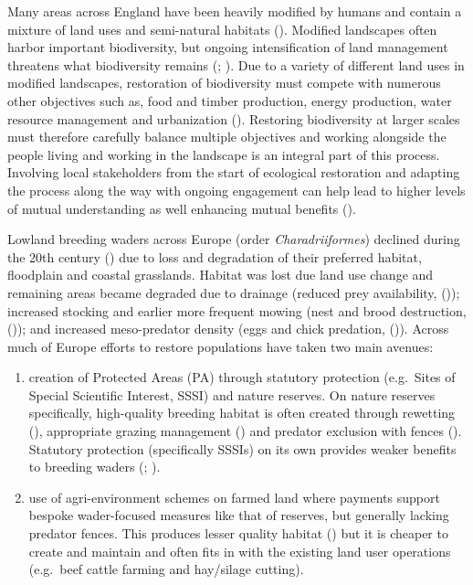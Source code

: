 \documentclass[
  12pt,
  letterpaper,
  DIV=11,
  numbers=noendperiod]{scrartcl}
\begin{document}
Many areas across England have been heavily modified by humans and
contain a mixture of land uses and semi-natural habitats
(). Modified landscapes often
harbor important biodiversity, but ongoing intensification of land
management threatens what biodiversity remains
(;
). Due to a
variety of different land uses in modified landscapes, restoration of
biodiversity must compete with numerous other objectives such as, food
and timber production, energy production, water resource management and
urbanization ().
Restoring biodiversity at larger scales must therefore carefully balance
multiple objectives and working alongside the people living and working
in the landscape is an integral part of this process. Involving local
stakeholders from the start of ecological restoration and adapting the
process along the way with ongoing engagement can help lead to higher
levels of mutual understanding as well enhancing mutual benefits
().

Lowland breeding waders across Europe (order \emph{Charadriiformes})
declined during the 20th century
() due
to loss and degradation of their preferred habitat, floodplain and
coastal grasslands. Habitat was lost due land use change and remaining
areas became degraded due to drainage (reduced prey availability,
()); increased
stocking and earlier more frequent mowing (nest and brood destruction,
()); and
increased meso-predator density (eggs and chick predation,
()). Across much of Europe
efforts to restore populations have taken two main avenues:

\begin{enumerate}
\def\labelenumi{\arabic{enumi}.}
\item
  creation of Protected Areas (PA) through statutory protection
  (e.g.~Sites of Special Scientific Interest, SSSI) and nature reserves.
  On nature reserves specifically, high-quality breeding habitat is
  often created through rewetting
  (), appropriate
  grazing management ()
  and predator exclusion with fences (). Statutory protection (specifically SSSIs) on its own
  provides weaker benefits to breeding waders
  (;
  ).
\item
  use of agri-environment schemes on farmed land where payments support
  bespoke wader-focused measures like that of reserves, but generally
  lacking predator fences. This produces lesser quality habitat
  () but it is cheaper to
  create and maintain and often fits in with the existing land user
  operations (e.g.~beef cattle farming and hay/silage cutting).
\end{enumerate}
\end{document}

